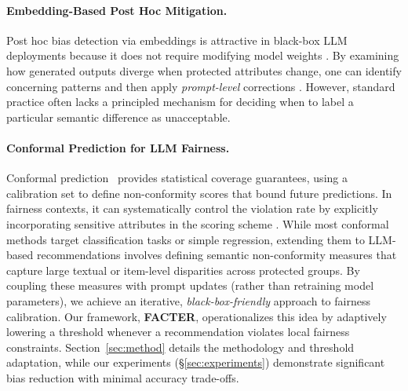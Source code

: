 \vspace{-1em}
\paragraph{Embedding-Based Post Hoc Mitigation.}
Post hoc bias detection via embeddings is attractive in black-box LLM deployments because it does not require modifying model weights \citep{borkan2019nuanced,lucy2021gender}. By examining how generated outputs diverge when protected attributes change, one can identify concerning patterns and then apply \emph{prompt-level} corrections \citep{zhang2023chatgpt}. However, standard practice often lacks a principled mechanism for deciding when to label a particular semantic difference as unacceptable.

\vspace{-1em}
\paragraph{Conformal Prediction for LLM Fairness.}
Conformal prediction~\citep{shafer2008tutorial} provides statistical coverage guarantees, using a calibration set to define non-conformity scores that bound future predictions. In fairness contexts, it can systematically control the violation rate by explicitly incorporating sensitive attributes in the scoring scheme \citep{dwork2012fairness}. While most conformal methods target classification tasks or simple regression, extending them to LLM-based recommendations involves defining semantic non-conformity measures that capture large textual or item-level disparities across protected groups. By coupling these measures with prompt updates (rather than retraining model parameters), we achieve an iterative, \emph{black-box-friendly} approach to fairness calibration. Our framework, \textbf{FACTER}, operationalizes this idea by adaptively lowering a threshold whenever a recommendation violates local fairness constraints. Section~\ref{sec:method} details the methodology and threshold adaptation, while our experiments (\S\ref{sec:experiments}) demonstrate significant bias reduction with minimal accuracy trade-offs.